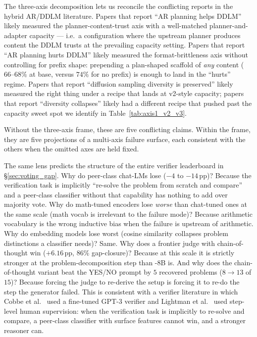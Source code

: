 The three-axis decomposition lets us reconcile the conflicting
reports in the hybrid AR/DDLM literature.  Papers that report ``AR
planning helps DDLM'' likely measured the planner-content-trust
axis with a well-matched planner-and-adapter capacity --- i.e.\ a
configuration where the upstream planner produces content the DDLM
trusts at the prevailing capacity setting.  Papers that report
``AR planning hurts DDLM'' likely measured the format-brittleness
axis without controlling for prefix shape: prepending a plan-shaped
scaffold of \emph{any} content ($66\text{--}68\%$ at base, versus
$74\%$ for no prefix) is enough to land in the
``hurts'' regime.  Papers that report ``diffusion sampling
diversity is preserved'' likely measured the right thing under a
recipe that lands at v2-style capacity; papers that report
``diversity collapses'' likely had a different recipe that pushed
past the capacity sweet spot we identify in
Table~\ref{tab:axis1_v2_v3}.

Without the three-axis frame, these are five conflicting claims.
Within the frame, they are five projections of a multi-axis
failure surface, each consistent with the others when the omitted
axes are held fixed.

The same lens predicts the structure of the entire verifier
leaderboard in \S\ref{sec:voting_gap}.  Why do peer-class
chat-LMs lose ($-4$ to $-14$\,pp)?  Because the verification task
is implicitly ``re-solve the problem from scratch and compare''
and a peer-class classifier without that capability has nothing
to add over majority vote.  Why do math-tuned encoders lose
\emph{worse} than chat-tuned ones at the same scale (math vocab
is irrelevant to the failure mode)?  Because arithmetic vocabulary
is the wrong inductive bias when the failure is upstream of
arithmetic.  Why do embedding models lose worst (cosine
similarity collapses problem distinctions a classifier needs)?
Same.  Why does a frontier judge with chain-of-thought win
($+6.16$\,pp, $86\%$ gap-closure)?  Because at this scale it is
strictly stronger at the problem-decomposition step than
\LLaDA{}-$8$B is.  And why does the chain-of-thought variant beat
the YES/NO prompt by $5$ recovered problems
($8 \to 13$ of $15$)?  Because forcing the judge to re-derive the
setup is forcing it to re-do the step the generator failed.  This
is consistent with a verifier literature in which Cobbe et
al.~\citep{cobbe2021verifier} used a fine-tuned GPT-$3$ verifier
and Lightman et al.~\citep{lightman2023letsverify} used
step-level human supervision: when the verification task is
implicitly to re-solve and compare, a peer-class classifier with
surface features cannot win, and a stronger reasoner can.

